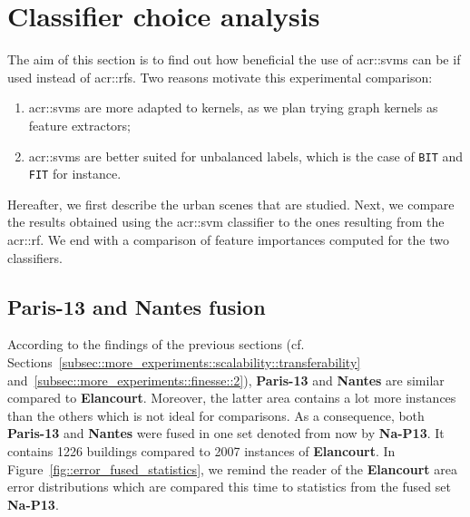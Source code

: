 \section{Classifier choice analysis}
    \label{sec::more_experiments::classifier}
    The aim of this section is to find out how beneficial the use of \glspl{acr::svm} can be if used instead of \glspl{acr::rf}.
    Two reasons motivate this experimental comparison:
    \begin{enumerate}[label=\roman*)]
        \item \glspl{acr::svm} are more adapted to kernels, as we plan trying graph kernels as feature extractors;
        \item \glspl{acr::svm} are better suited for unbalanced labels, which is the case of \texttt{BIT} and \texttt{FIT} for instance.
    \end{enumerate}
    Hereafter, we first describe the urban scenes that are studied.
    Next, we compare the results obtained using the \gls{acr::svm} classifier to the ones resulting from the \gls{acr::rf}.
    We end with a comparison of feature importances computed for the two classifiers.

    \subsection{\textbf{Paris-13} and \textbf{Nantes} fusion}
        \label{subsec::more_experiments::classifier::dataset}
        According to the findings of the previous sections (cf. Sections~\ref{subsec::more_experiments::scalability::transferability} and~\ref{subsec::more_experiments::finesse::2}), \textbf{Paris-13} and \textbf{Nantes} are similar compared to \textbf{Elancourt}.
        Moreover, the latter area contains a lot more instances than the others which is not ideal for comparisons.
        As a consequence, both \textbf{Paris-13} and \textbf{Nantes} were fused in one set denoted from now by \textbf{Na-P13}.
        It contains 1226 buildings compared to 2007 instances of \textbf{Elancourt}.
        In Figure~\ref{fig::error_fused_statistics}, we remind the reader of the \textbf{Elancourt} area error distributions which are compared this time to statistics from the fused set \textbf{Na-P13}.\\
    
